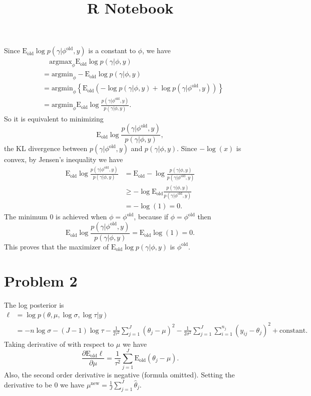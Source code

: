 \documentclass[
]{article}
\title{R Notebook}
\author{}
\date{\vspace{-2.5em}}
\begin{document}
\maketitle

Since \(\text{E}_{\text{old}}\log p(\gamma|\phi^{\text{old}}, y)\) is a
constant to \(\phi\), we have \begin{align*}
&\quad \text{argmax}_{\phi}\text{E}_{\text{old}}\log p(\gamma|\phi, y) \\
&= \text{argmin}_{\phi}-\text{E}_{\text{old}}\log p(\gamma|\phi, y) \\
&= \text{argmin}_{\phi}\left\{\text{E}_{\text{old}}(-\log p(\gamma|\phi, y) + \log p(\gamma|\phi^{\text{old}}, y)) \right\}\\
&=\text{argmin}_{\phi}\text{E}_{\text{old}}\log \frac{p(\gamma|\phi^{\text{old}}, y)}{ p(\gamma|\phi, y)}.
\end{align*} So it is equivalent to minimizing \[
\text{E}_{\text{old}}\log \frac{p(\gamma|\phi^{\text{old}}, y)}{ p(\gamma|\phi, y)},
\] the KL divergence between \(p(\gamma|\phi^{\text{old}}, y)\) and
\(p(\gamma|\phi, y)\). Since \(-\log(x)\) is convex, by Jensen's
inequality we have \begin{align*}
\text{E}_{\text{old}}\log \frac{p(\gamma|\phi^{\text{old}}, y)}{ p(\gamma|\phi, y)} &= \text{E}_{\text{old}}-\log \frac{ p(\gamma|\phi, y)}{p(\gamma|\phi^{\text{old}}, y)}\\
&\geq -\log\text{E}_{\text{old}} \frac{ p(\gamma|\phi, y)}{p(\gamma|\phi^{\text{old}}, y)}\\
&= -\log(1) = 0.
\end{align*} The minimum \(0\) is achieved when
\(\phi = \phi^{\text{old}}\), because if \(\phi = \phi^{\text{old}}\)
then
\[\text{E}_{\text{old}}\log \frac{p(\gamma|\phi^{\text{old}}, y)}{ p(\gamma|\phi, y)} = \text{E}_{\text{old}}\log (1) = 0.\]
This proves that the maximizer of
\(\text{E}_{\text{old}}\log p(\gamma|\phi, y)\) is
\(\phi^{\text{old}}.\)

\hypertarget{problem-2}{%
\section{Problem 2}\label{problem-2}}

The log posterior is \begin{align*}
\ell &= \log p(\theta, \mu, \log\sigma, \log\tau | y) \\
&= -n \log\sigma - (J-1)\log\tau - \frac{1}{2\tau^2}\sum_{j=1}^{J}(\theta_j-\mu)^2 - \frac{1}{2\sigma^2}\sum_{j=1}^{J}\sum_{i=1}^{n_j}(y_{ij}-\theta_j)^2 + \text{constant.}
\end{align*} Taking derivative of with respect to \(\mu\) we have \[
\frac{\partial \text{E}_{\text{old}}\ell}{\partial \mu} = \frac{1}{\tau^2}\sum_{j=1}^{J}\text{E}_{\text{old}}(\theta_j-\mu).
\] Also, the second order derivative is negative (formula omitted).
Setting the derivative to be \(0\) we have
\(\mu^{\text{new}} = \frac{1}{J}\sum_{j=1}^{J}\hat{\theta}_j\).
\end{document}
